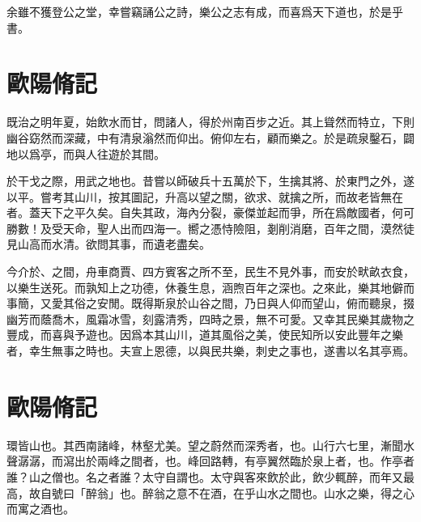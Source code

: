 余雖不獲登公之堂，幸嘗竊誦公之詩，樂公之志有成，而喜爲天下道也，於是乎書。%

\section[豐樂亭記\quad{\small 歐陽脩}]{{\normalsize 歐陽脩}\quad{}記}
既治之明年夏，始飲水而甘，問諸人，得於州南百步之近。其上聳然而特立，下則幽谷窈然而深藏，中有清泉滃然而仰出。俯仰左右，顧而樂之。於是疏泉鑿石，闢地以爲亭，而與人往遊於其間。

於干戈之際，用武之地也。昔嘗以師破兵十五萬於下，生擒其將、於東門之外，遂以平。嘗考其山川，按其圖記，升高以望之關，欲求、就擒之所，而故老皆無在者。蓋天下之平久矣。自失其政，海內分裂，豪傑並起而爭，所在爲敵國者，何可勝數！及受天命，聖人出而四海一。嚮之憑恃險阻，剗削消磨，百年之間，漠然徒見山高而水清。欲問其事，而遺老盡矣。

今介{於}、之間，舟車商賈、四方賓客之所不至，民生不見外事，而安於畎畝衣食，以樂生送死。而孰知上之功德，休養生息，涵煦{}百年之深也。之來此，樂其地僻而事簡，又愛其俗之安閒。既得斯泉於山谷之間，乃日與人仰而望山，俯而聽泉，掇幽芳而蔭喬木，風霜冰雪，刻露清秀，四時之景，無不可愛。又幸其民樂其歲物之豐成，而喜與予遊也。因爲本其山川，道其風俗之美，使民知所以安此豐年之樂者，幸生無事之時也。夫宣上恩德，以與民共樂，刺史之事也，遂書以名其亭焉。%

\theendnotes

\section[醉翁亭記\quad{\small 歐陽脩}]{{\normalsize 歐陽脩}\quad{}記}
環皆山也。其西南諸峰，林壑尤美。望之蔚然而深秀者，也。山行六七里，漸聞水聲潺潺，而瀉出於兩峰之間者，也。峰回路轉，有亭翼然臨於泉上者，也。作亭者誰？山之僧也。名之者誰？太守自謂也。太守與客來飲於此，飲少輒醉，而年又最高，故自號曰「醉翁」也。醉翁之意不在酒，在乎山水之間也。山水之樂，得之心而寓之酒也。

